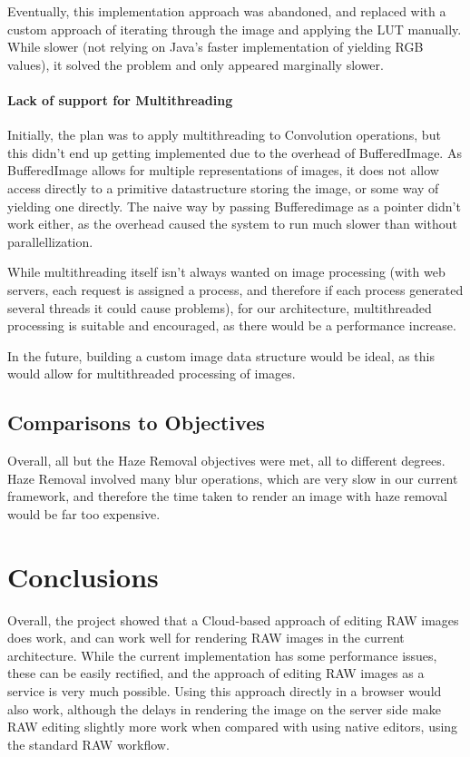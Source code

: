 \documentclass[10pt,a4paper]{article}
\begin{document}
Eventually, this implementation approach was abandoned, and replaced with a custom approach of iterating through the image and applying the LUT
manually. While slower (not relying on Java's faster implementation of yielding RGB values), it solved the problem and only appeared marginally slower.

\paragraph{Lack of support for Multithreading}
Initially, the plan was to apply multithreading to Convolution operations, but this didn't end up getting implemented due to the overhead of BufferedImage.
As BufferedImage allows for multiple representations of images, it does not allow access directly to a primitive datastructure storing the image, or some way of
yielding one directly. The naive way by passing Bufferedimage as a pointer didn't work either, as the overhead caused the system to run much slower than without parallellization.

While multithreading itself isn't always wanted on image processing (with web servers, each request is assigned a process, and therefore if each process generated several threads it could
cause problems), for our architecture, multithreaded processing is suitable and encouraged, as there would be a performance increase.

In the future, building a custom image data structure would be ideal, as this would allow for multithreaded processing of images.

\subsection{Comparisons to Objectives}
Overall, all but the Haze Removal objectives were met, all to different degrees. Haze Removal involved many blur operations, which are very slow in our current framework, and therefore the
time taken to render an image with haze removal would be far too expensive. 
\section{Conclusions}
Overall, the project showed that a Cloud-based approach of editing RAW images does work, and can work well for rendering RAW images in the current architecture.
While the current implementation has some performance issues, these can be easily rectified, and the approach of editing RAW images as a service is very much possible.
Using this approach directly in a browser would also work, although the delays in rendering the image on the server side make RAW editing slightly more work when compared with
using native editors, using the standard RAW workflow.



\end{document}
